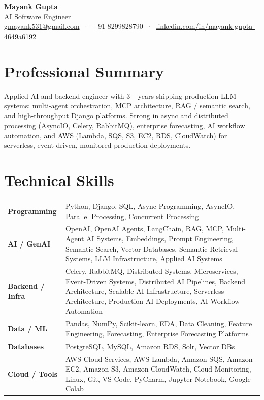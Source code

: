 \documentclass[10pt,a4paper]{article}
\begin{document}
\begin{center}
  {\LARGE\bfseries\color{primary} Mayank Gupta}\\[3pt]
  {\large\color{accent} AI Software Engineer}\\[5pt]
  {\small
    \href{mailto:gmayank531@gmail.com}{gmayank531@gmail.com}
    $\;\cdot\;$ +91-8299828790
    $\;\cdot\;$ \href{https://www.linkedin.com/in/mayank-gupta-4649a6192/}{linkedin.com/in/mayank-gupta-4649a6192}
  }
\end{center}
\vspace{-6pt}

\section{Professional Summary}
\small
Applied AI and backend engineer with 3+ years shipping production LLM systems: multi-agent orchestration, MCP architecture, RAG / semantic search, and high-throughput Django platforms. Strong in async and distributed processing (AsyncIO, Celery, RabbitMQ), enterprise forecasting, AI workflow automation, and AWS (Lambda, SQS, S3, EC2, RDS, CloudWatch) for serverless, event-driven, monitored production deployments.

\section{Technical Skills}
\small
\begin{tabularx}{\textwidth}{@{}>{\bfseries}p{1.28in} X@{}}
Programming & Python, Django, SQL, Async Programming, AsyncIO, Parallel Processing, Concurrent Processing \\[1pt]
AI / GenAI & OpenAI, OpenAI Agents, LangChain, RAG, MCP, Multi-Agent AI Systems, Embeddings, Prompt Engineering, Semantic Search, Vector Databases, Semantic Retrieval Systems, LLM Infrastructure, Applied AI Systems \\[1pt]
Backend / Infra & Celery, RabbitMQ, Distributed Systems, Microservices, Event-Driven Systems, Distributed AI Pipelines, Backend Architecture, Scalable AI Infrastructure, Serverless Architecture, Production AI Deployments, AI Workflow Automation \\[1pt]
Data / ML & Pandas, NumPy, Scikit-learn, EDA, Data Cleaning, Feature Engineering, Forecasting, Enterprise Forecasting Platforms \\[1pt]
Databases & PostgreSQL, MySQL, Amazon RDS, Solr, Vector DBs \\[1pt]
Cloud / Tools & AWS Cloud Services, AWS Lambda, Amazon SQS, Amazon EC2, Amazon S3, Amazon CloudWatch, Cloud Monitoring, Linux, Git, VS Code, PyCharm, Jupyter Notebook, Google Colab \\
\end{tabularx}
\end{document}
